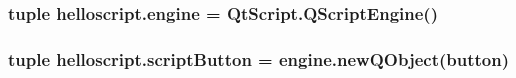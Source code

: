 \subsubsection[{engine}]{\setlength{\rightskip}{0pt plus 5cm}tuple helloscript.\+engine = Qt\+Script.\+Q\+Script\+Engine()}\label{namespacehelloscript_a6f91f11d9ba348ce8bcc2157967f0982}
\hypertarget{namespacehelloscript_a28325ef134033c6b58dea9a4eb265263}{}
\subsubsection[{script\+Button}]{\setlength{\rightskip}{0pt plus 5cm}tuple helloscript.\+script\+Button = engine.\+new\+Q\+Object({\bf button})}\label{namespacehelloscript_a28325ef134033c6b58dea9a4eb265263}
